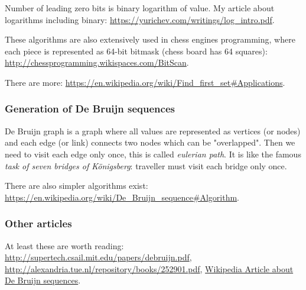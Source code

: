 Number of leading zero bits is binary logarithm of value. My article about logarithms including binary:
\url{https://yurichev.com/writings/log_intro.pdf}.

These algorithms are also extensively used in chess engines programming, where each piece is represented as 64-bit bitmask (chess board has 64 squares):
\url{http://chessprogramming.wikispaces.com/BitScan}.

There are more: \url{https://en.wikipedia.org/wiki/Find_first_set\#Applications}.

\subsubsection{Generation of De Bruijn sequences}

De Bruijn graph is a graph where all values are represented as vertices (or nodes) and each edge (or link) connects two nodes which can be "overlapped".
Then we need to visit each edge only once, this is called \textit{eulerian path}.
It is like the famous \textit{task of seven bridges of Königsberg}:
traveller must visit each bridge only once.

There are also simpler algorithms exist: \url{https://en.wikipedia.org/wiki/De_Bruijn_sequence\#Algorithm}.

\subsubsection{Other articles}

At least these are worth reading:
\url{http://supertech.csail.mit.edu/papers/debruijn.pdf},
\url{http://alexandria.tue.nl/repository/books/252901.pdf},
\href{https://en.wikipedia.org/wiki/De_Bruijn_sequence}{Wikipedia Article about De Bruijn sequences}.

